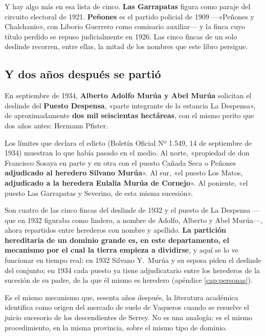 Y hay algo más en esa lista de cinco. \textbf{Las Garrapatas} figura como paraje del circuito
electoral de 1921. \textbf{Peñones} es el partido policial de 1909 —«Peñones y Chalchanio»,
con Liborio Guerrero como comisario auxiliar— y la finca cuyo título perdido se repuso
judicialmente en 1926. Las cinco fincas de un solo deslinde recorren, entre ellas, la mitad
de los nombres que este libro persigue.

\subsection*{Y dos años después se partió}

En septiembre de 1934, \textbf{Alberto Adolfo Murúa y Abel Murúa} solicitan el deslinde del
\textbf{Puesto Despensa}, «parte integrante de la estancia La Despensa», de aproximadamente
\textbf{dos mil seiscientas hectáreas}, con el mismo perito que dos años antes: Hermann
Pfister.

Los límites que declara el edicto (Boletín Oficial Nº 1.549, 14 de septiembre de 1934) muestran lo que había pasado en el medio. Al norte, «propiedad de don Francisco Sosaya en parte y en otra con el
puesto Cañada Seca o Peñones \textbf{adjudicado al heredero Silvano Murúa}». Al sur, «el
puesto Los Matos, \textbf{adjudicado a la heredera Eulalia Murúa de Cornejo}». Al poniente,
«el puesto Las Garrapatas y Severino, de esta misma sucesión».

Son cuatro de las cinco fincas del deslinde de 1932 y el puesto de La Despensa ---que en 1932 figuraba como lindero, a nombre de Adolfo, Alberto y Abel Murúa---, ahora repartidos entre herederos con
nombre y apellido. \textbf{La partición hereditaria de un dominio grande es, en este
departamento, el mecanismo por el cual la tierra empieza a dividirse}, y aquí se lo ve
funcionar en tiempo real: en 1932 Silvano Y.\ Murúa y su esposa piden el deslinde del conjunto; en 1934 cada
puesto ya tiene adjudicatario entre los herederos de la sucesión de su padre, de la que él mismo es heredero (apéndice \ref{cap:personas}).

Es el mismo mecanismo que, sesenta años después, la literatura académica identifica como
origen del mercado de suelo de Vaqueros cuando se resuelve el juicio sucesorio de los
descendientes de Serrey. No es una analogía: es el mismo procedimiento, en la misma
provincia, sobre el mismo tipo de dominio.

